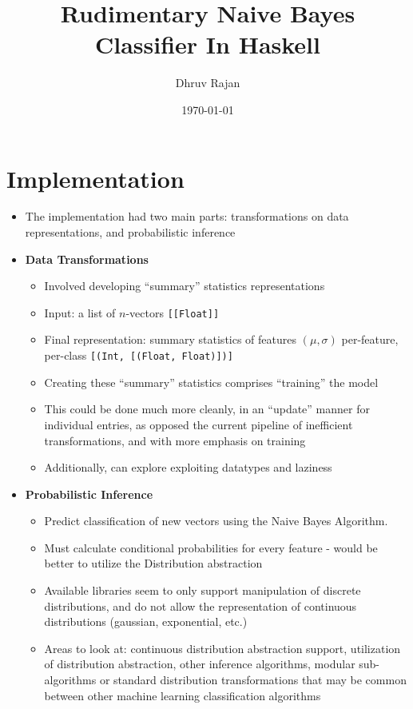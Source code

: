 \documentclass[12pt]{article}
\begin{document}
\title{Rudimentary Naive Bayes Classifier In Haskell}
\author{Dhruv Rajan}
\date{\today}
\maketitle

\section{Implementation}
\begin{itemize}
\item The implementation had two main parts: transformations on data representations, and probabilistic inference
\item \textbf{Data Transformations}
  \begin{itemize}
  \item Involved developing ``summary'' statistics representations
  \item Input: a list of $n$-vectors \texttt{[[Float]]}
  \item Final representation: summary statistics of features $(\mu, \sigma)$ per-feature,
    per-class \texttt{[(Int, [(Float, Float)])]}
  \item Creating these ``summary'' statistics comprises ``training'' the model
  \item This could be done much more cleanly, in an ``update'' manner for individual entries,
    as opposed the current pipeline of inefficient transformations, and with more emphasis on training
  \item Additionally, can explore exploiting datatypes and laziness
  \end{itemize}
\item \textbf{Probabilistic Inference}
  \begin{itemize}
  \item Predict classification of new vectors using the Naive Bayes Algorithm.
  \item Must calculate conditional probabilities for every feature - would be better to utilize
    the Distribution abstraction
  \item Available libraries seem to only support manipulation of discrete distributions, and do not
    allow the representation of continuous distributions (gaussian, exponential, etc.)
  \item Areas to look at: continuous distribution abstraction support, utilization of distribution abstraction,
    other inference algorithms, modular sub-algorithms or standard distribution transformations that may
    be common between other machine learning classification algorithms
  \end{itemize}
\end{itemize}
\end{document}
